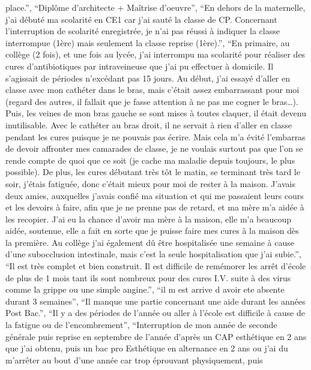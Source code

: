 \documentclass[
  letterpaper,
  DIV=11,
  numbers=noendperiod]{scrartcl}
\begin{document}
\begin{itemize}
  place.'', ``Diplôme d'architecte + Maîtrise d'oeuvre'', ``En dehors de
  la maternelle, j'ai débuté ma scolarité en CE1 car j'ai sauté la
  classe de CP. Concernant l'interruption de scolarité enregistrée, je
  n'ai pas réussi à indiquer la classe interrompue (1ère) mais seulement
  la classe reprise (1ère).'', ``En primaire, au collège (2 fois), et
  une fois au lycée, j'ai interrompu ma scolarité pour réaliser des
  cures d'antibiotiques par intraveineuse que j'ai pu effectuer à
  domicile. Il s'agissait de périodes n'excédant pas 15 jours. Au début,
  j'ai essayé d'aller en classe avec mon cathéter dans le bras, mais
  c'était assez embarrassant pour moi (regard des autres, il fallait que
  je fasse attention à ne pas me cogner le bras\ldots). Puis, les veines
  de mon bras gauche se sont mises à toutes claquer, il était devenu
  inutilisable. Avec le cathéter au bras droit, il ne servait à rien
  d'aller en classe pendant les cures puisque je ne pouvais pas écrire.
  Mais cela m'a évité l'embarras de devoir affronter mes camarades de
  classe, je ne voulais surtout pas que l'on se rende compte de quoi que
  ce soit (je cache ma maladie depuis toujours, le plus possible). De
  plus, les cures débutant très tôt le matin, se terminant très tard le
  soir, j'étais fatiguée, donc c'était mieux pour moi de rester à la
  maison. J'avais deux amies, auxquelles j'avais confié ma situation et
  qui me passaient leurs cours et les devoirs à faire, afin que je ne
  prenne pas de retard, et ma mère m'a aidée à les recopier. J'ai eu la
  chance d'avoir ma mère à la maison, elle m'a beaucoup aidée, soutenue,
  elle a fait en sorte que je puisse faire mes cures à la maison dès la
  première. Au collège j'ai également dû être hospitalisée une semaine à
  cause d'une subocclusion intestinale, mais c'est la seule
  hospitalisation que j'ai subie.'', ``Il est très complet et bien
  construit. Il est difficile de remémorer les arrêt d'école de plus de
  1 mois tant ils sont nombreux pour des cures I.V. suite à des virus
  comme la grippe ou une simple angine.'', ``il m est arrive d avoir ete
  absente durant 3 semaines'', ``Il manque une partie concernant une
  aide durant les années Post Bac.'', ``Il y a des périodes de l'année
  ou aller à l'école est difficile à cause de la fatigue ou de
  l'encombrement'', ``Interruption de mon année de seconde générale puis
  reprise en septembre de l'année d'après un CAP esthétique en 2 ans que
  j'ai obtenu, puis un bac pro Esthétique en alternance en 2 ans ou j'ai
  du m'arrêter au bout d'une année car trop éprouvant physiquement, puis

\end{itemize}
\end{document}
